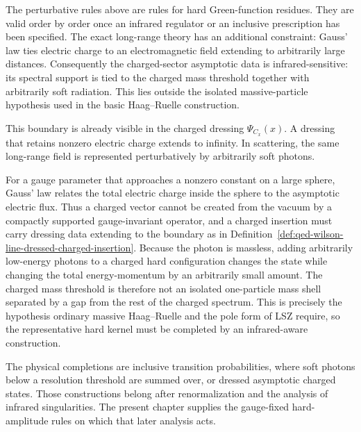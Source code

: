 \begin{remark}
The perturbative rules above are rules for hard Green-function residues. They
are valid order by order once an infrared regulator or an inclusive
prescription has been specified. The exact long-range theory has an additional
constraint: Gauss' law ties electric charge to an electromagnetic field
extending to arbitrarily large distances. Consequently the charged-sector
asymptotic data is infrared-sensitive: its spectral support is tied to the
charged mass threshold together with arbitrarily soft radiation. This lies
outside the isolated massive-particle hypothesis used in the basic
Haag--Ruelle construction.

This boundary is already visible in the charged dressing
\(\Psi_{C_x}(x)\). A dressing that retains nonzero electric charge extends to
infinity. In scattering, the same long-range field is represented
perturbatively by arbitrarily soft photons.

For a gauge parameter that approaches a nonzero constant on a large sphere,
Gauss' law relates the total electric charge inside the sphere to the
asymptotic electric flux.  Thus a charged vector cannot be created from the
vacuum by a compactly supported gauge-invariant operator, and a charged
insertion must carry dressing data extending to the boundary as in
Definition~\ref{def:qed-wilson-line-dressed-charged-insertion}.  Because the
photon is massless, adding arbitrarily low-energy photons to a charged hard
configuration changes the state while changing the total energy-momentum by
an arbitrarily small amount.  The charged mass threshold is therefore not an
isolated one-particle mass shell separated by a gap from the rest of the
charged spectrum.  This is precisely the hypothesis ordinary massive
Haag--Ruelle and the pole form of LSZ require, so the representative hard
kernel must be completed by an infrared-aware construction.
\end{remark}

The physical completions are inclusive transition probabilities, where soft
photons below a resolution threshold are summed over, or dressed asymptotic
charged states. Those constructions belong after renormalization and the
analysis of infrared singularities. The present chapter supplies the
gauge-fixed hard-amplitude rules on which that later analysis acts.
